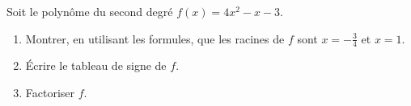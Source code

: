 
\begin{exercice}\label{exosmath-0122}

    Soit le polynôme du second degré \( f(x)=4x^2-x-3\).
    \begin{enumerate}
        \item
            Montrer, en utilisant les formules, que les racines de \( f\) sont \( x=-\frac{ 3 }{4}\) et \( x=1\).
        \item
            Écrire le tableau de signe de \( f\).
        \item
            Factoriser \( f\).
    \end{enumerate}

\end{exercice}
